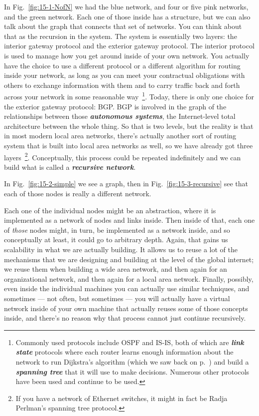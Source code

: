 \rrr In Fig.~\ref{fig:15-1-NofN} we had the blue network, and four or five pink networks, and the green network. Each one of those inside has a structure, but we can also talk about the graph that connects that set of networks. You can think about that as the recursion in the system. The system is essentially two layers: the interior gateway protocol and the exterior gateway protocol. The interior protocol is used to manage how you get around inside of your own network. You actually have the choice to use a different protocol or a different algorithm for routing inside your network, as long as you can meet your contractual obligations with others to exchange information with them and to carry traffic back and forth across your network in some reasonable way~\footnote{Commonly used protocols include OSPF and IS-IS, both of which are \textbf{\emph{link state}} protocols where each router learns enough information about the network to run Dijkstra's algorithm (which we saw back on p.~\pageref{dijkstra}) and build a \textbf{\emph{spanning tree}} that it will use to make decisions. Numerous other protocols have been used and continue to be used.}. Today, there is only one choice for the exterior gateway protocol: BGP. BGP is involved in the graph of the relationships between those \textbf{\emph{autonomous systems}}, the Internet-level total architecture between the whole thing. So that is two levels, but the reality is that in most modern local area networks, there's actually another sort of routing system that is built into local area networks as well, so we have already got three layers~\footnote{If you have a network of Ethernet switches, it might in fact be Radja Perlman's spanning tree protocol.}. Conceptually, this process could be repeated indefinitely and we can build what is called a \textbf{\emph{recursive network}}.

\mmm In Fig.~\ref{fig:15-2-simple} we see a graph, then in Fig.~\ref{fig:15-3-recursive} see that each of those nodes is really a different network.

\rrr Each one of the individual nodes might be an abstraction, where it is implemented as a network of nodes and links inside. Then inside of that, each one of \emph{those} nodes might, in turn, be implemented as a network inside, and so conceptually at least, it could go to arbitrary depth. Again, that gains us scalability in what we are actually building. It allows us to reuse a lot of the mechanisms that we are designing and building at the level of the global internet; we reuse them when building a wide area network, and then again for an organizational network, and then again for a local area network. Finally, possibly, even inside the individual machines you can actually use similar techniques, and sometimes --- not often, but sometimes --- you will actually have a virtual network inside of your own machine that actually reuses some of those concepts inside, and there's no reason why that process cannot just continue recursively.

